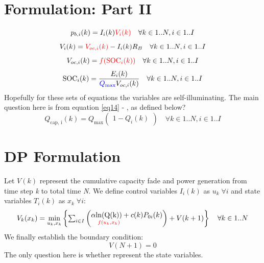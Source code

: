 \documentclass{article}
\begin{document}
\section{Formulation: Part II}
\begin{equation}\label{eq11}
	p_{b,i}(k) = I_i(k)\color{red}V_i(k)\color{black} \quad \forall k\in 1..N, i\in 1..I
\end{equation}
\begin{equation}\label{eq12}
	V_i(k) = \color{red}V_{oc,i}(k)\color{black} -I_i(k)R_B \quad \forall k\in 1..N, i\in 1..I
\end{equation}
\begin{equation}\label{eq13}
	V_{oc,i}(k) = \color{red}f(\text{SOC}_i(k))\color{black} \quad \forall k\in 1..N, i\in 1..I
\end{equation}
\begin{equation}\label{eq14}
	\text{SOC}_i(k) = \frac{E_i(k)}{\color{blue}Q_{\text{max}}\color{black}V_{oc,i}(k)}\quad \forall k\in 1..N, i\in 1..I
\end{equation}
Hopefully for these sets of equations the variables are self-illuminating. The main question here is from equation \color{red}\ref{eq14}\color{black} - , as defined below?
\begin{equation}\label{eq15}
	Q_{\text{cap, i}}(k) = Q_{\text{max}}\begin{pmatrix}1-Q_i(k)\end{pmatrix} \quad \forall k\in 1..N, i\in 1..I
\end{equation}

\section{DP Formulation}
Let $V(k)$ represent the cumulative capacity fade and power generation from time step \textit{k} to total time \textit{N}. We define control variables $I_i(k)$ as $u_k \; \forall i$ and state variables $T_i(k)$ as $x_k \; \forall i$:
\begin{equation}\label{eq16}
	V_k(x_k) = \underset{u_k,x_k}{\text{min}}\begin{Bmatrix}\sum_{i\in I}\begin{pmatrix}\alpha \underset{\color{red}f(u_k, x_k)\color{black}}{\text{ln(Q(k))}} + c(k)P_{0i}(k)\end{pmatrix} + V(k+1) \end{Bmatrix}\quad \forall k\in 1..N
\end{equation}
We finally establish the boundary condition: \[V(N+1) = 0\] The only question here is whether  represent the state variables.
\end{document}

